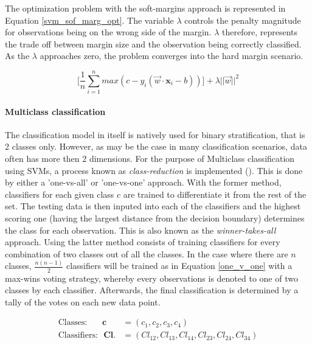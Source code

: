		The optimization problem with the soft-margins approach is represented in Equation \ref{svm_sof_marg_opt}. The variable $\lambda$ controls the penalty magnitude for observations being on the wrong side of the margin. $\lambda$ therefore, represents the trade off between margin size and the observation being correctly classified. As the $\lambda$ approaches zero, the problem converges into the hard margin scenario.
	
		\begin{equation}
			\Bigg[
			\frac{1}{n} \sum_{i=1}^{n}max(c-y_i(\vec{w} \cdot \textbf{x}_i - b )) 
			\Bigg]
			+ \lambda || \vec{w} ||^2
			\label{svm_sof_marg_opt}
		\end{equation}
	
	\paragraph{Multiclass classification}
		The classification model in itself is natively used for binary stratification, that is 2 classes only. However, as may be the case in many classification scenarios, data often has more then 2 dimensions. For the purpose of Multiclass classification using SVMs, a process known as \textit{class-reduction} is implemented (\cite{aly2005survey}). This is done by either a 'one-vs-all' or 'one-vs-one' approach. With the former method, classifiers for each given class $c$ are trained to differentiate it from the rest of the set. The testing data is then inputed into each of the classifiers and the highest scoring one (having the largest distance from the decision boundary) determines the class for each observation. This is also known as the \textit{winner-takes-all} approach. Using the latter method consists of training classifiers for every combination of two classes out of all the classes. In the case where there are $n$ classes, $\frac{n(n-1)}{2} $ classifiers will be trained as in Equation \ref{one_v_one} with
		a max-wins voting strategy, whereby every observations is denoted to one of two classes by each classifier. Afterwards, the final classification is determined by a tally of the votes on each new data point.
		
		\begin{equation}
			\begin{aligned}
				\text{Classes:}	\ \ \ \ \ \ \ \	\textbf{c} &= (c_1,c_2,c_3,c_4) \\
				\text{Classifiers:}\ \ \ 	\textbf{Cl.} &= (Cl_{12},Cl_{13},Cl_{14},Cl_{23},Cl_{24},Cl_{34})
			\end{aligned}	
			\label{one_v_one}
		\end{equation}
	
